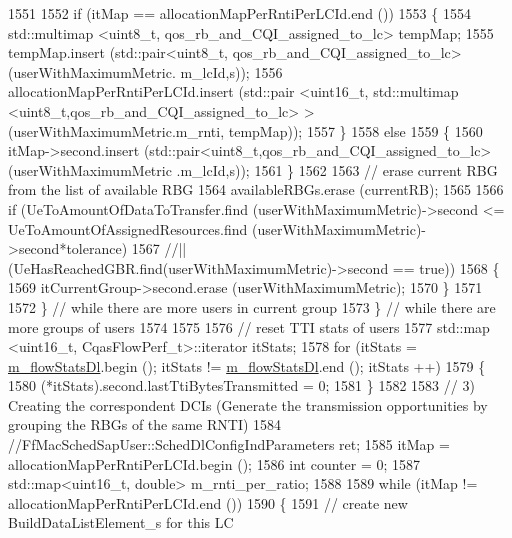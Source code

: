 \begin{DoxyCode}
1551 
1552           \textcolor{keywordflow}{if} (itMap == allocationMapPerRntiPerLCId.end ())
1553             \{
1554               std::multimap <uint8\_t, qos\_rb\_and\_CQI\_assigned\_to\_lc> tempMap;
1555               tempMap.insert (std::pair<uint8\_t, qos\_rb\_and\_CQI\_assigned\_to\_lc> (userWithMaximumMetric.
      m\_lcId,s));
1556               allocationMapPerRntiPerLCId.insert (std::pair <uint16\_t, std::multimap
       <uint8\_t,qos\_rb\_and\_CQI\_assigned\_to\_lc> > (userWithMaximumMetric.m\_rnti, tempMap));
1557             \}
1558           \textcolor{keywordflow}{else}
1559             \{
1560               itMap->second.insert (std::pair<uint8\_t,qos\_rb\_and\_CQI\_assigned\_to\_lc> (userWithMaximumMetric
      .m\_lcId,s));
1561             \}
1562 
1563           \textcolor{comment}{// erase current RBG from the list of available RBG}
1564           availableRBGs.erase (currentRB);
1565 
1566           \textcolor{keywordflow}{if} (UeToAmountOfDataToTransfer.find (userWithMaximumMetric)->second <= 
      UeToAmountOfAssignedResources.find (userWithMaximumMetric)->second*tolerance)
1567           \textcolor{comment}{//||(UeHasReachedGBR.find(userWithMaximumMetric)->second == true))}
1568             \{
1569               itCurrentGroup->second.erase (userWithMaximumMetric);
1570             \}
1571 
1572         \}                 \textcolor{comment}{// while there are more users in current group}
1573     \}             \textcolor{comment}{// while there are more groups of users}
1574 
1575 
1576   \textcolor{comment}{// reset TTI stats of users}
1577   std::map <uint16\_t, CqasFlowPerf\_t>::iterator itStats;
1578   \textcolor{keywordflow}{for} (itStats = \hyperlink{classns3_1_1CqaFfMacScheduler_a1cf6c47e55cbcfb9c28b17c242bde972}{m\_flowStatsDl}.begin (); itStats != \hyperlink{classns3_1_1CqaFfMacScheduler_a1cf6c47e55cbcfb9c28b17c242bde972}{m\_flowStatsDl}.end (); itStats
      ++)
1579     \{
1580       (*itStats).second.lastTtiBytesTransmitted = 0;
1581     \}
1582 
1583   \textcolor{comment}{// 3) Creating the correspondent DCIs (Generate the transmission opportunities by grouping the RBGs of
       the same RNTI)}
1584   \textcolor{comment}{//FfMacSchedSapUser::SchedDlConfigIndParameters ret;}
1585   itMap = allocationMapPerRntiPerLCId.begin ();
1586   \textcolor{keywordtype}{int} counter = 0;
1587   std::map<uint16\_t, double> m\_rnti\_per\_ratio;
1588 
1589   \textcolor{keywordflow}{while} (itMap != allocationMapPerRntiPerLCId.end ())
1590     \{
1591       \textcolor{comment}{// create new BuildDataListElement\_s for this LC}

\end{DoxyCode}
